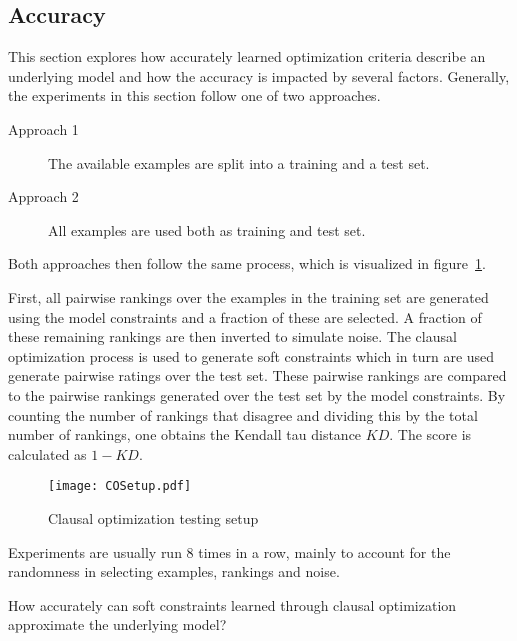 \subsection{Accuracy}

This section explores how accurately learned optimization criteria describe an underlying model and how the accuracy is impacted by several factors.
Generally, the experiments in this section follow one of two approaches.
\begin{description}
	\item[Approach 1] The available examples are split into a training and a test set.
	\item[Approach 2] All examples are used both as training and test set.
\end{description}
Both approaches then follow the same process, which is visualized in figure~\ref{fig:co_test_setup}.

First, all pairwise rankings over the examples in the training set are generated using the model constraints and a fraction of these are selected.
A fraction of these remaining rankings are then inverted to simulate noise.
The clausal optimization process is used to generate soft constraints which in turn are used generate pairwise ratings over the test set.
These pairwise rankings are compared to the pairwise rankings generated over the test set by the model constraints.
By counting the number of rankings that disagree and dividing this by the total number of rankings, one obtains the Kendall tau distance $\mathit{KD}$.
The score is calculated as $1 - \mathit{KD}$.

\begin{figure}

	\caption{Clausal optimization testing setup}
	\centering
		\texttt{[image: COSetup.pdf]}
	\label{fig:co_test_setup}

\end{figure}

Experiments are usually run $8$ times in a row, mainly to account for the randomness in selecting examples, rankings and noise.

\begin{question}
	How accurately can soft constraints learned through clausal optimization approximate the underlying model?
\end{question}

